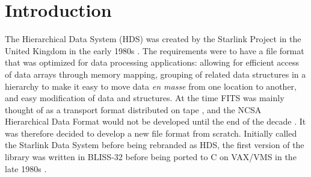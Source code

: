 \documentclass[final,authoryear,5p,times,twocolumn]{elsarticle}
\begin{document}

\newcommand{\mnras}{MNRAS}
\newcommand{\aap}{A\&A}
\newcommand{\aaps}{A\&AS}
\newcommand{\pasp}{PASP}
\newcommand{\apj}{ApJ}
\newcommand{\apjs}{ApJS}
\newcommand{\qjras}{QJRAS}
\newcommand{\an}{Astron.\ Nach.}
\newcommand{\ijimw}{Int.\ J.\ Infrared \& Millimeter Waves}
\newcommand{\procspie}{Proc.\ SPIE}
\newcommand{\aspconf}{ASP Conf. Ser.}


\newcommand{\KAPPA}{\textsc{kappa}}
\newcommand{\gaia}{\textsc{gaia}}
\newcommand{\figaro}{\textsc{figaro}}
\newcommand{\ccdpack}{\textsc{ccdpack}}
\newcommand{\smurf}{\textsc{smurf}}
\newcommand{\surf}{\textsc{surf}}
\newcommand{\asterix}{\textsc{asterix}}
\newcommand{\specdre}{\textsc{specdre}}
\newcommand{\iras}{\textsc{iras90}}
\newcommand{\treeview}{\textsc{treeview}}
\newcommand{\splat}{\textsc{splat}}
\newcommand{\catpac}{\textsc{catpac}}
\newcommand{\CFITSIO}{\textsc{cfitsio}}
\newcommand{\fitstondf}{\textsc{fits}{\footnotesize{2}}\textsc{ndf}}

\newcommand{\ascl}[1]{\href{http://www.ascl.net/#1}{ascl:#1}}

\section{Introduction}
\label{sec:intro}

The Hierarchical Data System (HDS) was created by the Starlink Project
in the United Kingdom in the early 1980s
\citep{1982QJRAS..23..485D,1991STARB...8....2L}. The requirements were
to have a file format that was optimized for data processing
applications: allowing for efficient access of data arrays through
memory mapping, grouping of related data structures in a hierarchy to
make it easy to move data \emph{en masse} from one location to
another, and easy modification of data and structures. At the time
FITS \citep{1981A&AS...44..363W} was mainly thought of as a transport
format distributed on tape \citep{1980SPIE..264..298G}, and the NCSA
Hierarchical Data Format would not be developed until the end of the
decade \citep{HDF1,Folk2010}. It was therefore decided to develop a
new file format from scratch. Initially called the Starlink Data
System before being rebranded as HDS, the first version of the library
was written in BLISS-32 before being ported to C on VAX/VMS in the
late 1980s \citep{SSN27a}.
\end{document}
